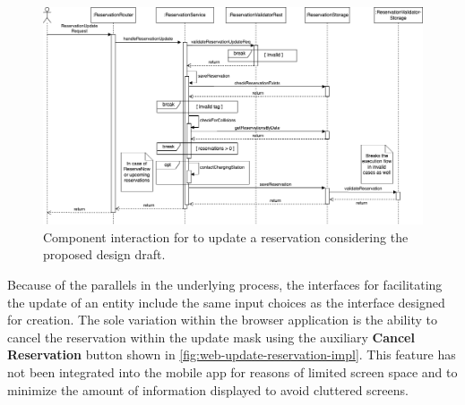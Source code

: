 \newpage

\begin{figure}[h]
    \centering
    \includegraphics[scale=0.4]{resources/images/main/6_implementation/processes/ReservationUpdate.png}
    \caption{Component interaction for to update a reservation considering the proposed design draft.}
    \label{fig:update-reservation-seqflow}
\end{figure}

\noindent Because of the parallels in the underlying process, the interfaces for facilitating the update of an entity include the same input choices as the interface designed for creation.
The sole variation within the browser application is the ability to cancel the reservation within the update mask using the auxiliary \textbf{Cancel Reservation} button shown in \ref{fig:web-update-reservation-impl}. 
This feature has not been integrated into the mobile app for reasons of limited screen space and to minimize the amount of information displayed to avoid cluttered screens.

